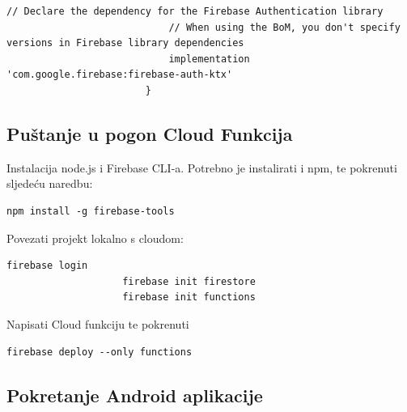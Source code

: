 \begin{packed_enum}
\begin{packed_enum}
\begin{lstlisting}[mathescape=true,breaklines=true,autogobble=true]
							// Declare the dependency for the Firebase Authentication library
							// When using the BoM, you don't specify versions in Firebase library dependencies
							implementation 'com.google.firebase:firebase-auth-ktx'
						}
					\end{lstlisting}
				\end{packed_enum}
		\end{packed_enum}	 
		
		\subsection{Puštanje u pogon Cloud Funkcija}
		\begin{packed_enum}
			\item Instalacija node.js i Firebase CLI-a. Potrebno je instalirati i npm, te pokrenuti sljedeću naredbu:
				\begin{lstlisting}[mathescape=true,breaklines=true,autogobble=true]
					npm install -g firebase-tools
				\end{lstlisting}
			\item Povezati projekt lokalno s cloudom:
				\begin{lstlisting}[mathescape=true,breaklines=true,autogobble=true]
					firebase login
					firebase init firestore
					firebase init functions
				\end{lstlisting}
			\item Napisati Cloud funkciju te pokrenuti
				\begin{lstlisting}[mathescape=true,breaklines=true,autogobble=true]
					firebase deploy --only functions
				\end{lstlisting}
		\end{packed_enum}

		\subsection{Pokretanje Android aplikacije}
			
			\eject 